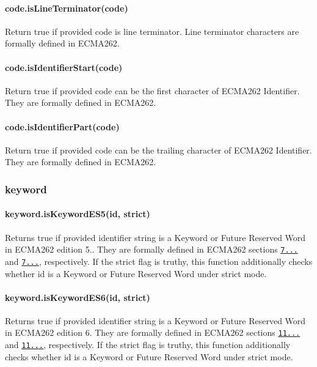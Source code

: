 \paragraph*{code.\+is\+Line\+Terminator(code)}

Return true if provided code is line terminator. Line terminator characters are formally defined in E\+C\+M\+A262.

\paragraph*{code.\+is\+Identifier\+Start(code)}

Return true if provided code can be the first character of E\+C\+M\+A262 Identifier. They are formally defined in E\+C\+M\+A262.

\paragraph*{code.\+is\+Identifier\+Part(code)}

Return true if provided code can be the trailing character of E\+C\+M\+A262 Identifier. They are formally defined in E\+C\+M\+A262.

\subsubsection*{keyword}

\paragraph*{keyword.\+is\+Keyword\+E\+S5(id, strict)}

Returns {\ttfamily true} if provided identifier string is a Keyword or Future Reserved Word in E\+C\+M\+A262 edition 5.. They are formally defined in E\+C\+M\+A262 sections \href{http://es5.github.io/#x7.6.1.1}{\tt 7...} and \href{http://es5.github.io/#x7.6.1.2}{\tt 7...}, respectively. If the {\ttfamily strict} flag is truthy, this function additionally checks whether {\ttfamily id} is a Keyword or Future Reserved Word under strict mode.

\paragraph*{keyword.\+is\+Keyword\+E\+S6(id, strict)}

Returns {\ttfamily true} if provided identifier string is a Keyword or Future Reserved Word in E\+C\+M\+A262 edition 6. They are formally defined in E\+C\+M\+A262 sections \href{https://people.mozilla.org/~jorendorff/es6-draft.html#sec-keywords}{\tt 11...} and \href{https://people.mozilla.org/~jorendorff/es6-draft.html#sec-future-reserved-words}{\tt 11...}, respectively. If the {\ttfamily strict} flag is truthy, this function additionally checks whether {\ttfamily id} is a Keyword or Future Reserved Word under strict mode.

